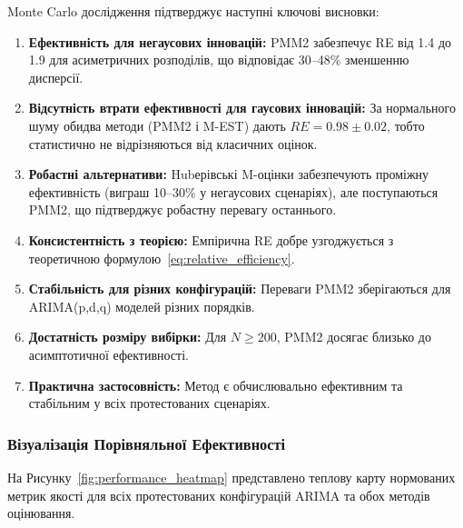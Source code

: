 \documentclass[12pt,a4paper]{article}
\begin{document}
Monte Carlo дослідження підтверджує наступні ключові висновки:

\begin{enumerate}
    \item \textbf{Ефективність для негаусових інновацій:} PMM2 забезпечує RE від 1.4 до 1.9 для асиметричних розподілів, що відповідає 30--48\% зменшенню дисперсії.

\item \textbf{Відсутність втрати ефективності для гаусових інновацій:} За нормального шуму обидва методи (PMM2 і M-EST) дають $RE = 0.98 \pm 0.02$, тобто статистично не відрізняються від класичних оцінок.
\item \textbf{Робастні альтернативи:} Hubерівські M-оцінки забезпечують проміжну ефективність (виграш 10--30\% у негаусових сценаріях), але поступаються PMM2, що підтверджує робастну перевагу останнього.

    \item \textbf{Консистентність з теорією:} Емпірична RE добре узгоджується з теоретичною формулою~\eqref{eq:relative_efficiency}.

    \item \textbf{Стабільність для різних конфігурацій:} Переваги PMM2 зберігаються для ARIMA(p,d,q) моделей різних порядків.

    \item \textbf{Достатність розміру вибірки:} Для $N \geq 200$, PMM2 досягає близько до асимптотичної ефективності.

    \item \textbf{Практична застосовність:} Метод є обчислювально ефективним та стабільним у всіх протестованих сценаріях.
\end{enumerate}

\subsubsection{Візуалізація Порівняльної Ефективності}

На Рисунку~\ref{fig:performance_heatmap} представлено теплову карту нормованих метрик якості для всіх протестованих конфігурацій ARIMA та обох методів оцінювання.
\end{document}
